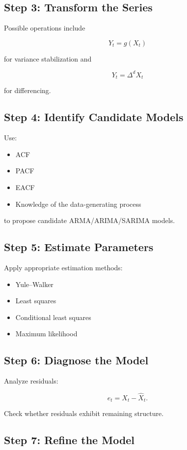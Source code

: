 \documentclass[11pt]{article}
\begin{document}
\subsection*{Step 3: Transform the Series}

Possible operations include

\[
Y_t = g(X_t)
\]

for variance stabilization and

\[
Y_t = \Delta^d X_t
\]

for differencing.

\subsection*{Step 4: Identify Candidate Models}

Use:

\begin{itemize}
    \item ACF
    \item PACF
    \item EACF
    \item Knowledge of the data-generating process
\end{itemize}

to propose candidate ARMA/ARIMA/SARIMA models.

\subsection*{Step 5: Estimate Parameters}

Apply appropriate estimation methods:

\begin{itemize}
    \item Yule--Walker
    \item Least squares
    \item Conditional least squares
    \item Maximum likelihood
\end{itemize}

\subsection*{Step 6: Diagnose the Model}

Analyze residuals:

\[
e_t = X_t-\widehat{X}_t.
\]

Check whether residuals exhibit remaining structure.

\subsection*{Step 7: Refine the Model}
\end{document}
